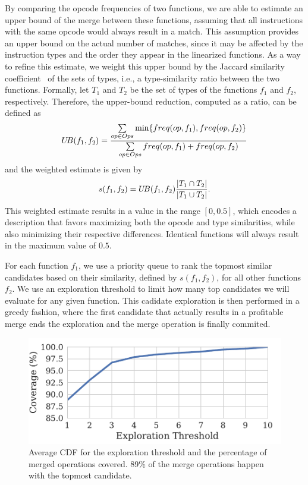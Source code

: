 By comparing the opcode frequencies of two functions, we are able to estimate
an upper bound of the merge between these functions, assuming that all
instructions with the same opcode would always result in a match.
This assumption provides an upper bound on the actual number of matches, since
it may be affected by the instruction types and the order they appear in the
linearized functions.
As a way to refine this estimate, we weight this upper bound by the Jaccard
similarity coefficient~\cite{jaccard} of the sets of types, i.e., a
type-similarity ratio between the two functions.
Formally, let $T_1$ and $T_2$ be the set of types of the functions $f_1$ and
$f_2$, respectively.
Therefore, the upper-bound reduction, computed as a ratio, can be defined as
\vspace{-1.5ex}\[
   U\!B(f_1,f_2) = \frac{\sum\limits_{op \in Ops} \min\{freq(op,f_1),freq(op,f_2)\}}{\sum\limits_{op \in Ops} freq(op,f_1)+freq(op,f_2)}
\vspace{-1.5ex}
\]
and the weighted estimate is given by
\vspace{-1.5ex}\[
     s(f_1,f_2) = U\!B(f_1,f_2) \frac{|T_1 \cap T_2|}{|T_1 \cup T_2|}.
\vspace{-1.5ex}
\]
This weighted estimate results in a value in the range $[0,0.5]$,
which encodes a description that favors maximizing both the opcode and type
similarities, while also minimizing their respective differences.
Identical functions will always result in the maximum value of $0.5$.

For each function $f_1$, we use a priority queue to rank the topmost
similar candidates based on their similarity, defined by $s(f_1,f_2)$, for all
other functions $f_2$.
We use an exploration threshold to limit how many top candidates we will
evaluate for any given function.
This cadidate exploration is then performed in a greedy fashion, where the first
candidate that actually results in a profitable merge ends the exploration and
the merge operation is finally commited.

\begin{figure}[t!]
  \centering
  \includegraphics[width=0.8\linewidth]{figs/average-cdf-exploration-threshold.pdf}
  \caption{Average CDF for the exploration threshold and the percentage of merged operations covered.
           89\% of the merge operations happen with the topmost candidate.}
  \label{fig:average-cdf-exploration-threshold}
\end{figure}

